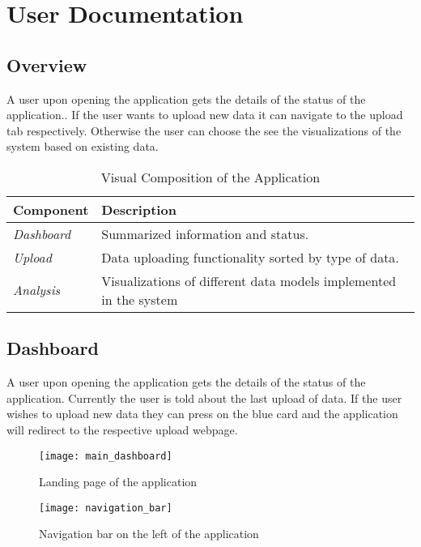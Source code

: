 \chapter{User Documentation} %
\label{ch:user}

\section{Overview}

A user upon opening the application gets the details of the status of the application..
If the user wants to upload new data it can navigate to the upload tab respectively. Otherwise the user 
can choose the see the visualizations of the system based on existing data.

\begin{table}[H]
	\centering
	\begin{tabular}{ | m{} | m{} | }
		\hline
		\textbf{Component} & \textbf{Description} \\
		\hline \hline
		\emph{Dashboard} & Summarized information and status. \\
		\hline
		\emph{Upload} & Data uploading functionality sorted by type of data. \\
		\hline
		\emph{Analysis} & Visualizations of different data models implemented in the system \\
		\hline
	\end{tabular}
	\caption{Visual Composition of the Application}
	\label{tab:overall}
\end{table}

\section{Dashboard}

A user upon opening the application gets the details of the status of the application.
Currently the user is told about the last upload of data. If the user wishes to upload new
data they can press on the blue card and the application will redirect to the respective upload
webpage.

\begin{figure}[H]
	\centering
	\texttt{[image: main\_dashboard]}
	\caption{Landing page of the application}
	\label{fig:landing-page}
\end{figure}

\begin{figure}[H]
	\centering
	\texttt{[image: navigation\_bar]}
	\caption{Navigation bar on the left of the application}
	\label{fig:navigation}
\end{figure}


